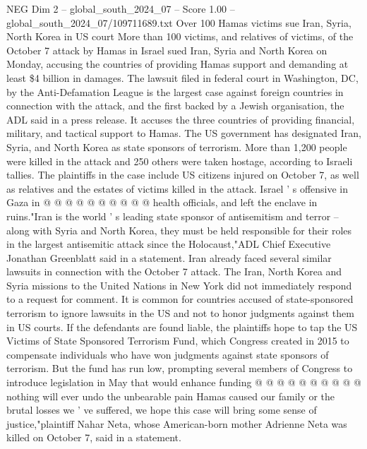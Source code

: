 \begin{textsample}{NEG Dim 2 – global\_south\_2024\_07 – Score 1.00 – global\_south\_2024\_07/109711689.txt}  \label{ex:f2_neg_378}
Over 100 Hamas victims sue Iran, Syria, North Korea in US court More than 100 victims, and relatives of victims, of the October 7 attack by Hamas in Israel sued Iran, Syria and North Korea on Monday, accusing the countries of providing Hamas support and demanding at least \$4 billion in damages.
The lawsuit filed in federal court in Washington, DC, by the Anti-Defamation League is the largest case against foreign countries in connection with the attack, and the first backed by a Jewish organisation, the ADL said in a press release.
It accuses the three countries of providing financial, military, and tactical support to Hamas.
The US government has designated Iran, Syria, and North Korea as state sponsors of terrorism.
More than 1,200 people were killed in the attack and 250 others were taken hostage, according to Israeli tallies.
The plaintiffs in the case include US citizens injured on October 7, as well as relatives and the estates of victims killed in the attack.
Israel ' s offensive in Gaza in @ @ @ @ @ @ @ @ @ @ health officials, and left the enclave in ruins."Iran is the world ' s leading state sponsor of antisemitism and terror -- along with Syria and North Korea, they must be held responsible for their roles in the largest antisemitic attack since the Holocaust,"ADL Chief Executive Jonathan Greenblatt said in a statement.
Iran already faced several similar lawsuits in connection with the October 7 attack.
The Iran, North Korea and Syria missions to the United Nations in New York did not immediately respond to a request for comment.
It is common for countries accused of state-sponsored terrorism to ignore lawsuits in the US and not to honor judgments against them in US courts.
If the defendants are found liable, the plaintiffs hope to tap the US Victims of State Sponsored Terrorism Fund, which Congress created in 2015 to compensate individuals who have won judgments against state sponsors of terrorism.
But the fund has run low, prompting several members of Congress to introduce legislation in May that would enhance funding @ @ @ @ @ @ @ @ @ @ nothing will ever undo the unbearable pain Hamas caused our family or the brutal losses we ' ve suffered, we hope this case will bring some sense of justice,"plaintiff Nahar Neta, whose American-born mother Adrienne Neta was killed on October 7, said in a statement.

\end{textsample}

